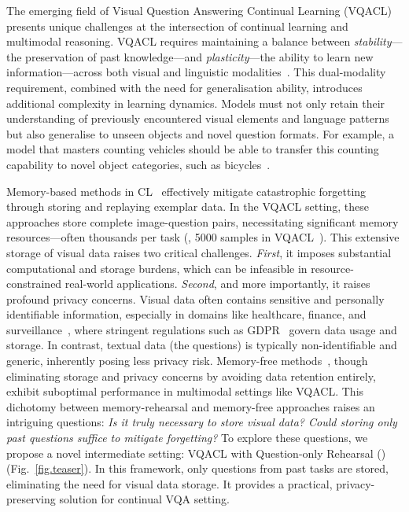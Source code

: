 The emerging field of Visual Question Answering Continual Learning (VQACL)~\citep{zhang2023vqacl} presents unique challenges at the intersection of continual learning and multimodal reasoning. VQACL requires maintaining a balance between \textit{stability}—the preservation of past knowledge—and \textit{plasticity}—the ability to learn new information—across both visual and linguistic modalities~\citep{zhang2023vqacl, antol2015vqa}. This dual-modality requirement, combined with the need for generalisation ability, introduces additional complexity in learning dynamics. Models must not only retain their understanding of previously encountered visual elements and language patterns but also generalise to unseen objects and novel question formats. For example, a model that masters counting vehicles should be able to transfer this counting capability to novel object categories, such as bicycles~\citep{greco-etal-2019-psycholinguistics}. 

Memory-based methods in CL~\citep{chaudhry2019tinyepisodicmemoriescontinual, Chaudhry2019er, Wan_2022_CVPR, zhang2023vqacl} effectively  mitigate catastrophic forgetting through storing and replaying exemplar data. In the VQACL setting, these approaches store complete image-question pairs, necessitating significant memory resources—often thousands per task (\eg, 5000 samples in VQACL~\citep{zhang2023vqacl}). This extensive storage of visual data raises two critical challenges. \emph{First}, it imposes substantial computational and storage burdens, which can be infeasible in resource-constrained real-world applications. \emph{Second}, and more importantly, it raises profound privacy concerns. Visual data often contains sensitive and personally identifiable information, especially in domains like healthcare, finance, and surveillance~\citep{tian2024privacy, liu2022privacy}, where stringent regulations such as GDPR~\citep{gdpr2016general, 10.1145/3389685} govern data usage and storage. In contrast, textual data (the questions) is typically non-identifiable and generic, inherently posing less privacy risk. Memory-free methods~\citep{kruengkrai-yamagishi-2022-mitigating, mas2018, Zhang_2024_CVPR, kirkpatrick2017overcoming}, though eliminating storage and privacy concerns by avoiding data retention entirely, exhibit suboptimal performance in multimodal settings like VQACL. This dichotomy between memory-rehearsal and memory-free approaches raises an intriguing questions: \textit{Is it truly necessary to store visual data? Could storing only past questions suffice to mitigate forgetting?} To explore these questions, we propose a novel intermediate setting: VQACL with Question-only Rehearsal (\setting) (Fig.~\ref{fig.teaser}). In this framework, only questions from past tasks are stored, eliminating the need for visual data storage. It provides a practical, privacy-preserving solution for continual VQA setting.

